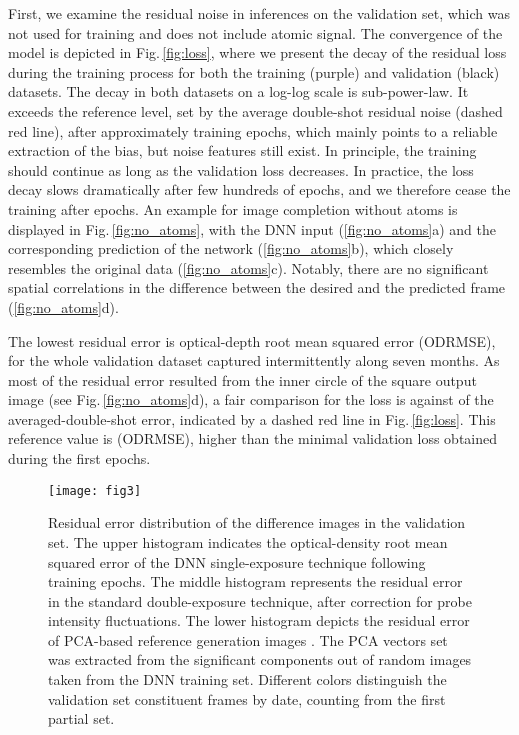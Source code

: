 \documentclass[twocolumn,groupedaddress,longbibliography]{revtex4-1}
\begin{document}
First, we examine the residual noise in inferences on the validation set, which was not used for training and does not include atomic signal. The convergence of the model is depicted in Fig.\,\ref{fig:loss}, where we present the decay of the residual loss during the training process for both the training (purple) and validation (black) datasets. The decay in both datasets on a log-log scale is sub-power-law. It exceeds the reference level, set by the average double-shot residual noise (dashed red line), after approximately  training epochs, which mainly points to a reliable extraction of the bias, but noise features still exist.
In principle, the training should continue as long as the validation loss decreases. In practice, the loss decay slows dramatically after few hundreds of epochs, and we therefore cease the training after  epochs. An example for image completion without atoms is displayed in Fig.\,\ref{fig:no_atoms}, with the DNN input (\ref{fig:no_atoms}a) and the corresponding prediction of the network (\ref{fig:no_atoms}b), which closely resembles the original data (\ref{fig:no_atoms}c). Notably, there are no significant spatial correlations in the difference between the desired and the predicted frame (\ref{fig:no_atoms}d).

The lowest residual error is  optical-depth root mean squared error (ODRMSE), for the whole validation dataset captured intermittently along seven months. As most of the residual error resulted from the inner circle of the square output image (see Fig.\,\ref{fig:no_atoms}d), a fair comparison for the loss is against  of the averaged-double-shot error, indicated by a dashed red line in Fig.\,\ref{fig:loss}. This reference value is  (ODRMSE),  higher than the minimal validation loss obtained during the first  epochs.

\begin{figure}
\centering
\texttt{[image: fig3]}
\caption{Residual error distribution of the difference images in the validation set. The upper histogram indicates the optical-density root mean squared error of the DNN single-exposure technique following  training epochs. The middle histogram represents the residual error in the standard double-exposure technique, after correction for probe intensity fluctuations. The lower histogram depicts the residual error of PCA-based reference generation images \cite{Niu2018}. The PCA vectors set was extracted from the  significant components out of  random images taken from the DNN training set. Different colors distinguish the validation set constituent frames by date, counting from the first partial set.
}
\label{fig:loss_hist}
\end{figure}
\end{document}
